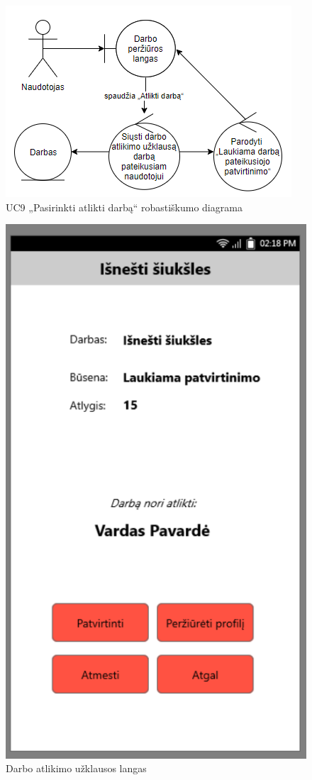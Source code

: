 \documentclass{VUMIFPSbakalaurinis}
\begin{document}
\begin{figure}[H]
	\centering
	\includegraphics[scale=0.6]{img/Robustness/UC9}
	\caption{UC9 „Pasirinkti atlikti darbą“ robastiškumo diagrama}
	\label{img:uc9rob}
\end{figure}

\begin{figure}[H]
	\centering
	\includegraphics[scale=0.4]{img/ScreenShots/2}
	\caption{Darbo atlikimo užklausos langas}
	\label{img:selected job 2}
\end{figure}
\end{document}
